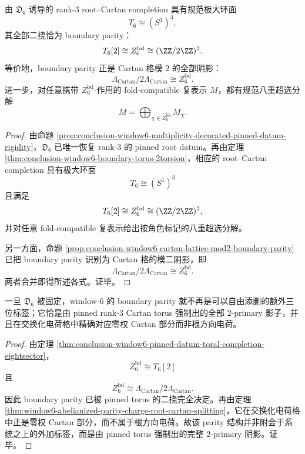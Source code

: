 \begin{theorem}\label{thm:conclusion-window6-pinned-datum-toral-completion-eightsector}
由 \(\mathfrak D_6\) 诱导的 rank-\(3\) root--Cartan completion 具有规范极大环面
\[
T_6\cong (S^1)^3,
\]
其全部二挠恰为 boundary parity：
\[
T_6[2]\cong Z_6^{\mathrm{bd}}\cong (\ZZ/2\ZZ)^3.
\]
等价地，boundary parity 正是 Cartan 格模 \(2\) 的全部阴影：
\[
\Lambda_{\mathrm{Cartan}}/2\Lambda_{\mathrm{Cartan}}
\cong
Z_6^{\mathrm{bd}}.
\]
进一步，对任意携带 \(Z_6^{\mathrm{bd}}\)-作用的 fold-compatible 复表示 \(M\)，都有规范八重超选分解
\[
M=\bigoplus_{\chi\in \widehat{Z_6^{\mathrm{bd}}}} M_\chi.
\]
\end{theorem}
\begin{proof}
由命题 \ref{prop:conclusion-window6-multiplicity-decorated-pinned-datum-rigidity}，\(\mathfrak D_6\) 已唯一恢复 rank-\(3\) 的 pinned root datum。再由定理 \ref{thm:conclusion-window6-boundary-torus-2torsion}，相应的 root--Cartan completion 具有极大环面
\[
T_6\cong (S^1)^3
\]
且满足
\[
T_6[2]\cong Z_6^{\mathrm{bd}}\cong (\ZZ/2\ZZ)^3,
\]
并对任意 fold-compatible 复表示给出按角色标记的八重超选分解。

另一方面，命题 \ref{prop:conclusion-window6-cartan-lattice-mod2-boundary-parity} 已把 boundary parity 识别为 Cartan 格的模二阴影，即
\[
\Lambda_{\mathrm{Cartan}}/2\Lambda_{\mathrm{Cartan}}
\cong
Z_6^{\mathrm{bd}}.
\]
两者合并即得所述各式。证毕。
\end{proof}

\begin{corollary}\label{cor:conclusion-window6-boundary-parity-complete-torus-shadow}
一旦 \(\mathfrak D_6\) 被固定，window-\(6\) 的 boundary parity 就不再是可以自由添删的额外三位标签；它恰是由 pinned rank-\(3\) Cartan torus 强制出的全部 \(2\)-primary 影子，并且在交换化电荷格中精确对应零权 Cartan 部分而非根方向电荷。
\end{corollary}
\begin{proof}
由定理 \ref{thm:conclusion-window6-pinned-datum-toral-completion-eightsector}，
\[
Z_6^{\mathrm{bd}}\cong T_6[2]
\]
且
\[
Z_6^{\mathrm{bd}}\cong \Lambda_{\mathrm{Cartan}}/2\Lambda_{\mathrm{Cartan}}.
\]
因此 boundary parity 已被 pinned torus 的二挠完全决定。再由定理 \ref{thm:window6-abelianized-parity-charge-root-cartan-splitting}，它在交换化电荷格中正是零权 Cartan 部分，而不属于根方向电荷。故该 parity 结构并非附会于系统之上的外加标签，而是由 pinned torus 强制出的完整 \(2\)-primary 阴影。证毕。
\end{proof}


